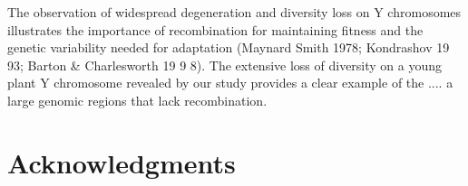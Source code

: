 \documentclass[9pt,twocolumn,twoside]{gsajnl}
\begin{document}
The observation of widespread degeneration and diversity loss on Y chromosomes illustrates the importance of recombination for maintaining fitness and the genetic variability needed for adaptation (Maynard Smith 1978; Kondrashov 19 93; Barton & Charlesworth 19 9 8). The extensive loss of diversity on a young plant Y chromosome revealed by our study provides a clear example of the .... a large genomic regions that lack recombination.

\section*{Acknowledgments}



\end{document}
